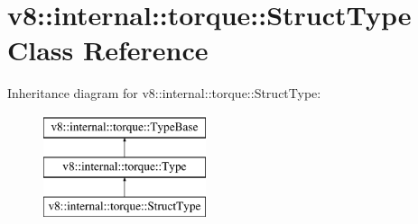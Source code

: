 \hypertarget{classv8_1_1internal_1_1torque_1_1StructType}{}\section{v8\+:\+:internal\+:\+:torque\+:\+:Struct\+Type Class Reference}
\label{classv8_1_1internal_1_1torque_1_1StructType}
Inheritance diagram for v8\+:\+:internal\+:\+:torque\+:\+:Struct\+Type\+:\begin{figure}[H]
\begin{center}
\leavevmode
\includegraphics[height=3.000000cm]{classv8_1_1internal_1_1torque_1_1StructType}
\end{center}
\end{figure}

